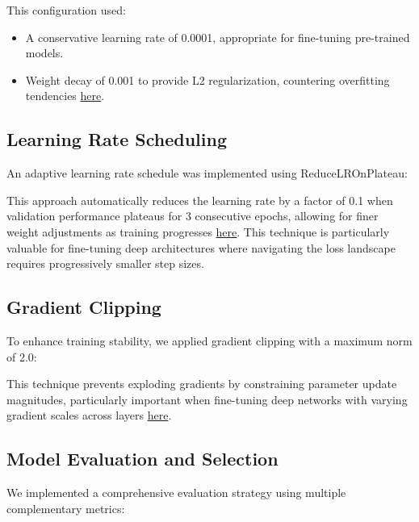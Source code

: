 \documentclass[a4paper,12pt]{article}
\begin{document}
This configuration used:
\begin{itemize}
    \item A conservative learning rate of 0.0001, appropriate for fine-tuning pre-trained models.
    \item Weight decay of 0.001 to provide L2 regularization, countering overfitting tendencies \href{https://openreview.net/forum?id=Bkg6RiCqY7}{here}.
\end{itemize}

\subsection{Learning Rate Scheduling}
An adaptive learning rate schedule was implemented using ReduceLROnPlateau:


This approach automatically reduces the learning rate by a factor of 0.1 when validation performance plateaus for 3 consecutive epochs, allowing for finer weight adjustments as training progresses \href{https://ieeexplore.ieee.org/document/7926641}{here}. This technique is particularly valuable for fine-tuning deep architectures where navigating the loss landscape requires progressively smaller step sizes.

\subsection{Gradient Clipping}
To enhance training stability, we applied gradient clipping with a maximum norm of 2.0:


This technique prevents exploding gradients by constraining parameter update magnitudes, particularly important when fine-tuning deep networks with varying gradient scales across layers \href{http://proceedings.mlr.press/v28/pascanu13.pdf}{here}.

\subsection{Model Evaluation and Selection}
We implemented a comprehensive evaluation strategy using multiple complementary metrics:
\end{document}
